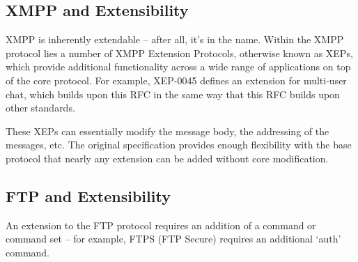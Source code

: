 \documentclass{article}
\begin{document}
\subsection{XMPP and Extensibility}
XMPP is inherently extendable -- after all, it's in the name. Within the XMPP
protocol lies a number of XMPP Extension Protocols, otherwise known as XEPs,
which provide additional functionality across a wide range of applications on
top of the core protocol. For example, XEP-0045 defines an extension for
multi-user chat, which builds upon this RFC in the same way that this RFC builds
upon other standards.

These XEPs can essentially modify the message body, the addressing of the messages, etc. The original specification provides enough flexibility with the base protocol that nearly any extension can be added without core modification. 

\subsection{FTP and Extensibility}
An extension to the FTP protocol requires an addition of a command or command set -- for example, FTPS (FTP Secure) requires an additional `auth' command.
\end{document}
